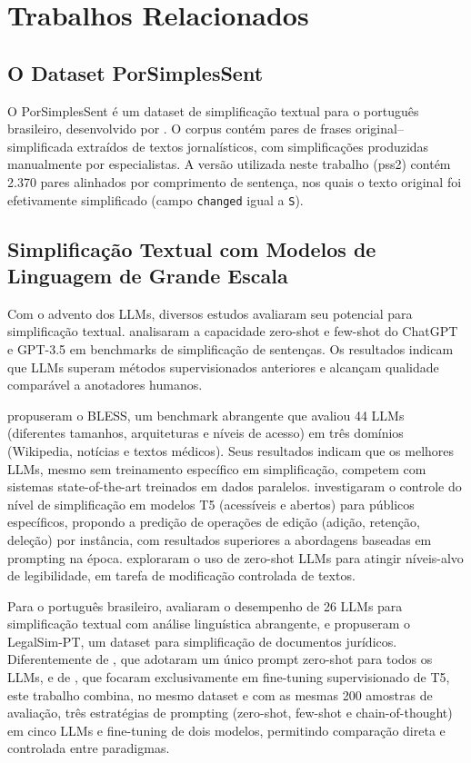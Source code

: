 \documentclass[a4paper, twocolumn, 11pt, twoside]{article}
\begin{document}
\section{Trabalhos Relacionados}

\subsection{O Dataset PorSimplesSent}

O PorSimplesSent é um dataset de simplificação textual para o português
brasileiro, desenvolvido por \citet{caseli2009}. O corpus contém pares de
frases original--simplificada extraídos de textos jornalísticos, com
simplificações produzidas manualmente por especialistas. A versão utilizada
neste trabalho (pss2) contém 2.370 pares alinhados por comprimento de
sentença, nos quais o texto original foi efetivamente simplificado
(campo \texttt{changed} igual a \texttt{S}).

\subsection{Simplificação Textual com Modelos de Linguagem de Grande Escala}

Com o advento dos LLMs, diversos estudos avaliaram seu potencial para
simplificação textual. \citet{feng2023} analisaram a capacidade
zero-shot e few-shot do ChatGPT e GPT-3.5 em benchmarks de
simplificação de sentenças. Os resultados indicam que LLMs superam
métodos supervisionados anteriores e alcançam qualidade
comparável a anotadores humanos.

\citet{kew2023bless} propuseram o BLESS, um benchmark abrangente que
avaliou 44 LLMs (diferentes tamanhos, arquiteturas e níveis de
acesso) em três domínios (Wikipedia, notícias e textos
médicos). Seus resultados indicam que os melhores LLMs, mesmo sem
treinamento específico em simplificação, competem com sistemas
state-of-the-art treinados em dados paralelos.
\citet{agrawal2023controlling} investigaram o controle do nível de
simplificação em modelos T5 (acessíveis e abertos) para públicos
específicos, propondo a predição de operações de
edição (adição, retenção, deleção) por instância, com resultados
superiores a abordagens baseadas em prompting na época.
\citet{farajidizaji2024} exploraram o uso de zero-shot LLMs para
atingir níveis-alvo de legibilidade, em tarefa de modificação
controlada de textos.

Para o português brasileiro, \citet{scalercio2025evaluating} avaliaram o
desempenho de 26 LLMs para simplificação textual com análise linguística
abrangente, e \citet{scalercio2026legalsim} propuseram o LegalSim-PT,
um dataset para simplificação de documentos jurídicos.
Diferentemente de \citet{scalercio2025evaluating}, que adotaram um único
prompt zero-shot para todos os LLMs, e de \citet{agrawal2023controlling},
que focaram exclusivamente em fine-tuning supervisionado de T5, este
trabalho combina, no mesmo dataset e com as mesmas 200 amostras de
avaliação, três estratégias de prompting (zero-shot, few-shot e
chain-of-thought) em cinco LLMs e fine-tuning de dois modelos, permitindo
comparação direta e controlada entre paradigmas.
\end{document}
